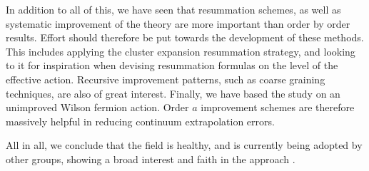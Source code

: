 In addition to all of this, we have seen that resummation schemes, as well as
systematic improvement of the theory are more important than order by order
results. Effort should therefore be put towards the development of these
methods. This includes applying the cluster expansion resummation strategy, and
looking to it for inspiration when devising resummation formulas on the level of
the effective action. Recursive improvement patterns, such as coarse graining
techniques, are also of great interest. Finally, we have based the study on an
unimproved Wilson fermion action. Order $a$ improvement schemes are therefore
massively helpful in reducing continuum extrapolation errors.

All in all, we conclude that the field is healthy, and is currently being
adopted by other groups, showing a broad interest and faith in the approach
\citep{Scior:2015vra,Scior:2016fso,Rindlisbacher:2015pea}.
